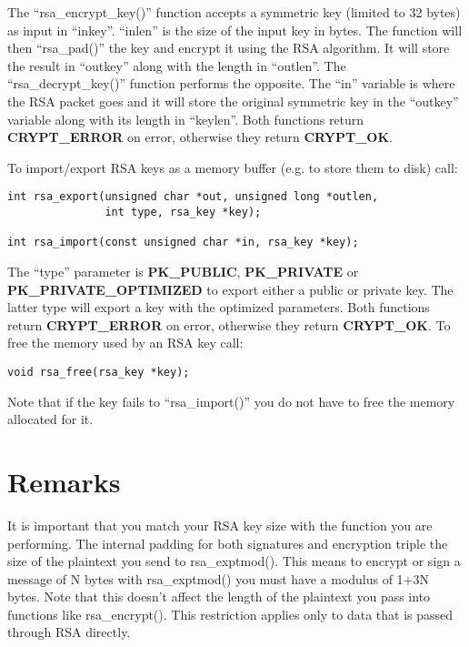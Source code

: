 \documentclass{book}
\begin{document}
The ``rsa\_encrypt\_key()'' function accepts a symmetric key (limited to 32 bytes) as input in ``inkey''.  ``inlen''
is the size of the input key in bytes.  The function will then ``rsa\_pad()'' the key and encrypt it using the RSA
algorithm.  It will store the result in ``outkey'' along with the length in ``outlen''.  The ``rsa\_decrypt\_key()'' function
performs the opposite.  The ``in'' variable is where the RSA packet goes and it will store the original symmetric key in
the ``outkey'' variable along with its length in ``keylen''.  Both functions return {\bf CRYPT\_ERROR} on error, otherwise
they return {\bf CRYPT\_OK}. 

To import/export RSA keys as a memory buffer (e.g. to store them to disk) call:
\begin{verbatim}
int rsa_export(unsigned char *out, unsigned long *outlen, 
               int type, rsa_key *key);

int rsa_import(const unsigned char *in, rsa_key *key);
\end{verbatim}

The ``type'' parameter is {\bf PK\_PUBLIC}, {\bf PK\_PRIVATE} or {\bf PK\_PRIVATE\_OPTIMIZED} to export either a public or 
private key.  The latter type will export a key with the optimized parameters.  Both functions return 
{\bf CRYPT\_ERROR} on error, otherwise they return {\bf CRYPT\_OK}.  To free the memory used by an RSA key call:
\begin{verbatim}
void rsa_free(rsa_key *key);
\end{verbatim}

Note that if the key fails to ``rsa\_import()'' you do not have to free the memory allocated for it.

\section{Remarks}
It is important that you match your RSA key size with the function you are performing.  The internal padding for both
signatures and encryption triple the size of the plaintext you send to rsa\_exptmod().  This means to encrypt or sign
a message of N bytes with rsa\_exptmod() you must have a modulus of 1+3N bytes.  Note that this doesn't affect the length
of the plaintext you pass into functions like rsa\_encrypt().  This restriction applies only to data that is passed through
RSA directly.
\end{document}
